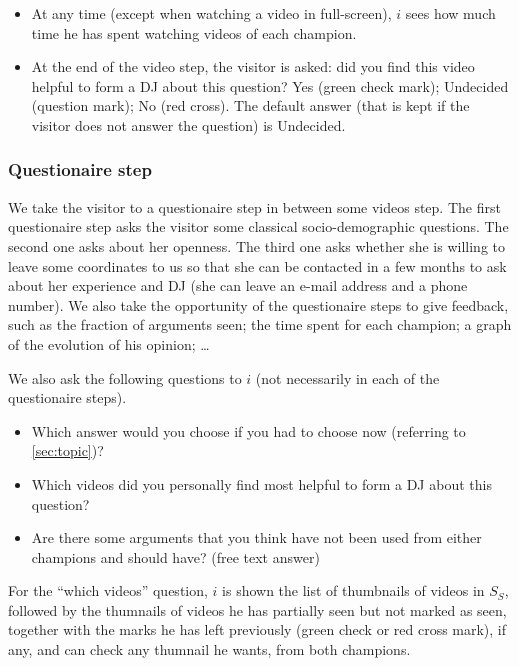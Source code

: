 \documentclass[version=3.21, pagesize, twoside=off, bibliography=totoc, DIV=calc, fontsize=12pt, a4paper]{scrartcl}
\begin{document}
\begin{itemize}
	\item At any time (except when watching a video in full-screen), $i$ sees how much time he has spent watching videos of each champion.
	\item At the end of the video step, the visitor is asked: did you find this video helpful to form a \ac{DJ} about this question? Yes (green check mark); Undecided (question mark); No (red cross). The default answer (that is kept if the visitor does not answer the question) is Undecided.
\end{itemize}

\subsubsection{Questionaire step}
We take the visitor to a questionaire step in between some videos step. The first questionaire step asks the visitor some classical socio-demographic questions. The second one asks about her openness. The third one asks whether she is willing to leave some coordinates to us so that she can be contacted in a few months to ask about her experience and \ac{DJ} (she can leave an e-mail address and a phone number). We also take the opportunity of the questionaire steps to give feedback, such as the fraction of arguments seen; the time spent for each champion; a graph of the evolution of his opinion; … 

We also ask the following questions to $i$ (not necessarily in each of the questionaire steps).
\begin{itemize}
	\item Which answer would you choose if you had to choose now (referring to \cref{sec:topic})?
	\item Which videos did you personally find most helpful to form a \ac{DJ} about this question?
	\item Are there some arguments that you think have not been used from either champions and should have? (free text answer)
\end{itemize}
For the “which videos” question, $i$ is shown the list of thumbnails of videos in $S_S$, followed by the thumnails of videos he has partially seen but not marked as seen, together with the marks he has left previously (green check or red cross mark), if any, and can check any thumnail he wants, from both champions. 
\end{document}
